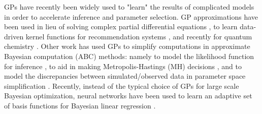GPs have recently been widely used to "learn" the results of complicated models in order to accelerate inference and parameter selection. 
GP approximations have been used in lieu of solving complex partial differential equations \citep{SacksEtal1989, CurrinEtall1991}, to learn data-driven kernel functions for recommendation systems \citep{SchwaighoferEtAl2005}, and recently for quantum chemistry \citep{RuppEtAl2012}. 
%
Other work has used GPs to simplify computations in approximate Bayesian computation (ABC) methods: namely to model the likelihood function for inference \citep{Wilkinsons2014}, to aid in making Metropolis-Hastings (MH) decisions \citep{MeedsWelling2014}, and to model the discrepancies between simulated/observed data in parameter space simplification \citep{GuttmanCorander2015}.
Recently, instead of the typical choice of GPs for large scale Bayesian optimization, neural networks have been used to learn an adaptive set of basis functions for Bayesian linear regression \citep{SnoekEtAl2015}.

